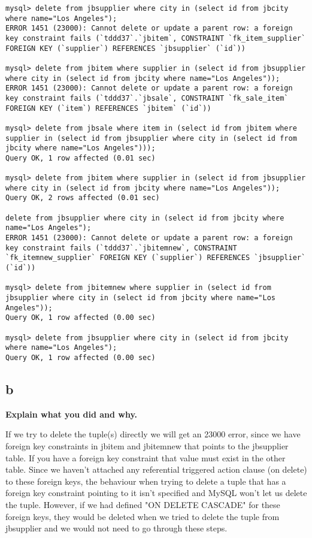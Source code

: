 \documentclass{article}
\begin{document}
\begin{lstlisting}
mysql> delete from jbsupplier where city in (select id from jbcity where name="Los Angeles");
ERROR 1451 (23000): Cannot delete or update a parent row: a foreign key constraint fails (`tddd37`.`jbitem`, CONSTRAINT `fk_item_supplier` FOREIGN KEY (`supplier`) REFERENCES `jbsupplier` (`id`))

mysql> delete from jbitem where supplier in (select id from jbsupplier where city in (select id from jbcity where name="Los Angeles"));
ERROR 1451 (23000): Cannot delete or update a parent row: a foreign key constraint fails (`tddd37`.`jbsale`, CONSTRAINT `fk_sale_item` FOREIGN KEY (`item`) REFERENCES `jbitem` (`id`))

mysql> delete from jbsale where item in (select id from jbitem where supplier in (select id from jbsupplier where city in (select id from jbcity where name="Los Angeles")));
Query OK, 1 row affected (0.01 sec)

mysql> delete from jbitem where supplier in (select id from jbsupplier where city in (select id from jbcity where name="Los Angeles"));                             
Query OK, 2 rows affected (0.01 sec)

delete from jbsupplier where city in (select id from jbcity where name="Los Angeles");
ERROR 1451 (23000): Cannot delete or update a parent row: a foreign key constraint fails (`tddd37`.`jbitemnew`, CONSTRAINT `fk_itemnew_supplier` FOREIGN KEY (`supplier`) REFERENCES `jbsupplier` (`id`))

mysql> delete from jbitemnew where supplier in (select id from jbsupplier where city in (select id from jbcity where name="Los Angeles"));
Query OK, 1 row affected (0.00 sec)

mysql> delete from jbsupplier where city in (select id from jbcity where name="Los Angeles");
Query OK, 1 row affected (0.00 sec)
\end{lstlisting}

\subsection*{b}
\textbf{Explain what you did and why.}

If we try to delete the tuple(s) directly we will get an 23000 error, since we have foreign key constraints in jbitem and jbitemnew that points to the jbsupplier table. If you have a foreign key constraint that value must exist in the other table. Since we haven't attached any referential triggered action clause (on delete) to these foreign keys, the behaviour when trying to delete a tuple that has a foreign key constraint pointing to it isn't specified and MySQL won't let us delete the tuple. However, if we had defined "ON DELETE CASCADE" for these foreign keys, they would be deleted when we tried to delete the tuple from jbsupplier and we would not need to go through these steps.
\end{document}
